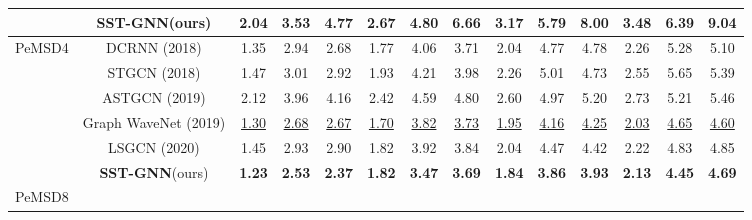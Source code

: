 \documentclass[runningheads]{llncs}
\begin{document}
\begin{table*}[!b]
{\begin{tabular}{c|c|ccc|ccc|ccc|ccc}
                      
                          
                          & \textbf{SST-GNN}(ours) & \textbf{2.04} & \textbf{3.53} & \textbf{4.77} & \textbf{2.67} &
                    \textbf{4.80} & \textbf{6.66} &
                    \textbf{3.17} &
                    \textbf{5.79} &
                    \textbf{8.00} &
                    \textbf{3.48} & \textbf{6.39} &
                    \textbf{9.04} 
\\ \hline
\multirow{6}{*}{PeMSD4}   

                          & DCRNN (2018) & 1.35 & 2.94 & 2.68 & 1.77 & 4.06 & 3.71 & 2.04 & 4.77 & 4.78 & 2.26 & 5.28 & 5.10 \\ 
                          & STGCN (2018)  & 1.47 & 3.01 & 2.92 & 1.93 & 4.21 & 3.98 & 2.26 & 5.01 & 4.73 & 2.55 & 5.65 & 5.39\\  
                          & ASTGCN (2019) & 2.12 & 3.96 & 4.16 & 2.42 & 4.59 & 4.80 & 2.60 & 4.97 & 5.20 & 2.73 & 5.21 &5.46 \\ 
                          & Graph WaveNet (2019) & \underline{1.30} & \underline{2.68} &\underline{2.67} & \underline{1.70} & \underline{3.82} & \underline{3.73} &  \underline{1.95} & \underline{4.16} & \underline{4.25} & \underline{2.03} & \underline{4.65} & \underline{4.60}\\
                          & LSGCN (2020)  &{1.45} & {2.93} & {2.90} & {1.82} & {3.92} & {3.84} & {2.04} & {4.47} & {4.42} & {2.22} & {4.83} & {4.85} \\ 
                           & \textbf{SST-GNN}(ours) & \textbf{1.23} & \textbf{2.53} & \textbf{2.37} & \textbf{1.82} & \textbf{3.47} & \textbf{3.69} & \textbf{1.84} & \textbf{3.86} & \textbf{3.93} & \textbf{2.13} & \textbf{4.45} & \textbf{4.69}  \\ \hline
\multirow{6}{*}{PeMSD8}  
 

\end{tabular}}
\end{table*}
\end{document}

